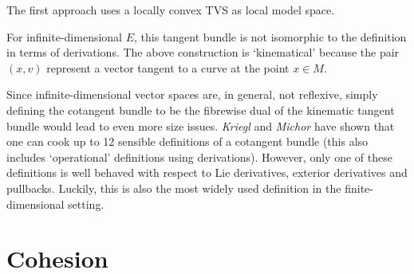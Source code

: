     The first approach uses a locally convex TVS as local model space.

    \begin{remark}
        For infinite-dimensional $E$, this tangent bundle is not isomorphic to the definition in terms of derivations. The above construction is `kinematical' because the pair $(x,v)$ represent a vector tangent to a curve at the point $x\in M$.
    \end{remark}

    Since infinite-dimensional vector spaces are, in general, not reflexive, simply defining the cotangent bundle to be the fibrewise dual of the kinematic tangent bundle would lead to even more size issues. \textit{Kriegl} and \textit{Michor} have shown that one can cook up to 12 sensible definitions of a cotangent bundle (this also includes `operational' definitions using derivations). However, only one of these definitions is well behaved with respect to Lie derivatives, exterior derivatives and pullbacks. Luckily, this is also the most widely used definition in the finite-dimensional setting.

\section{Cohesion}\label{section:cohesion}

